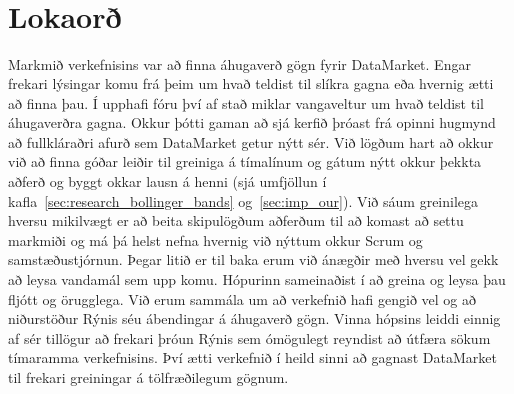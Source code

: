 \documentclass{article}
\begin{document}
\hfil \\
\hfil \\
\hfil \\
\hfil \\

\newpage

\section{Lokaorð}
Markmið verkefnisins var að finna áhugaverð gögn fyrir DataMarket. Engar frekari lýsingar komu frá þeim um hvað teldist til slíkra gagna 
eða hvernig ætti að finna þau. Í upphafi fóru því af stað miklar vangaveltur um hvað teldist til áhugaverðra gagna. 
Okkur þótti gaman að sjá kerfið þróast frá opinni hugmynd að fullkláraðri afurð sem DataMarket getur nýtt sér.
Við lögðum hart að okkur við að finna góðar leiðir til greiniga á tímalínum og gátum nýtt okkur þekkta aðferð og byggt 
okkar lausn á henni (sjá umfjöllun í kafla~\ref{sec:research_bollinger_bands} og~\ref{sec:imp_our}).
Við sáum greinilega hversu mikilvægt er að beita skipulögðum aðferðum til að komast að settu markmiði og má þá helst nefna hvernig
við nýttum okkur Scrum og samstæðustjórnun. Þegar litið er til baka erum við ánægðir með hversu vel gekk að leysa 
vandamál sem upp komu. Hópurinn sameinaðist í að greina og leysa þau fljótt og örugglega.
Við erum sammála um að verkefnið hafi gengið vel og að niðurstöður Rýnis séu ábendingar á áhugaverð gögn.
Vinna hópsins leiddi einnig af sér tillögur að frekari þróun Rýnis sem ómögulegt reyndist að útfæra sökum tímaramma verkefnisins.
Því ætti verkefnið í heild sinni að gagnast DataMarket til frekari greiningar á tölfræðilegum gögnum.
\end{document}
